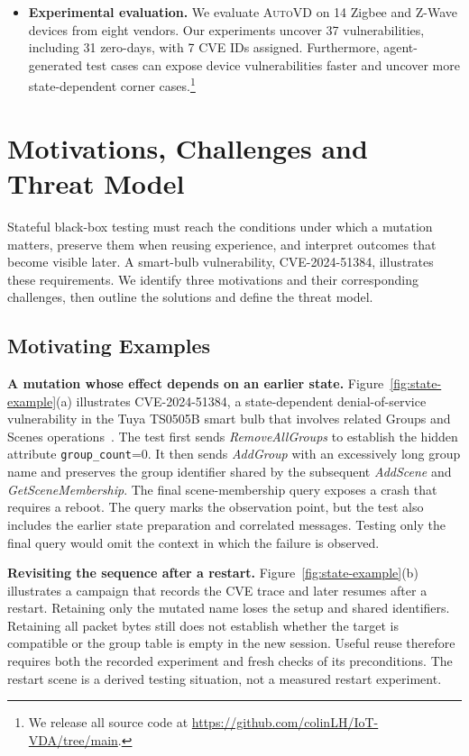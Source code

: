 \documentclass[10pt,journal,compsoc]{IEEEtran}
\newcommand{\system}{\textsc{AutoVD}}
\newcommand{\parab}[1]{\vspace{0.04in}\noindent\textbf{#1}}
\begin{document}
\begin{itemize}
  \item \textbf{Experimental evaluation.} We evaluate \system{} on 14 Zigbee and Z-Wave devices from eight vendors. Our experiments uncover 37 vulnerabilities, including 31 zero-days, with 7 CVE IDs assigned. Furthermore, agent-generated test cases can expose device vulnerabilities faster and uncover more state-dependent corner cases.\footnote{We release all source code at \url{https://github.com/colinLH/IoT-VDA/tree/main}.}
\end{itemize}

\section{Motivations, Challenges and Threat Model}\label{sec:motivation}
Stateful black-box testing must reach the conditions under which a mutation matters, preserve them when reusing experience, and interpret outcomes that become visible later. A smart-bulb vulnerability, CVE-2024-51384, illustrates these requirements. We identify three motivations and their corresponding challenges, then outline the solutions and define the threat model.

\subsection{Motivating Examples}\label{sec:examples}
\parab{A mutation whose effect depends on an earlier state.}
Figure~\ref{fig:state-example}(a) illustrates CVE-2024-51384, a state-dependent denial-of-service vulnerability in the Tuya TS0505B smart bulb that involves related Groups and Scenes operations~\cite{zvdetector}. The test first sends \emph{RemoveAllGroups} to establish the hidden attribute \texttt{group\_count}=0. It then sends \emph{AddGroup} with an excessively long group name and preserves the group identifier shared by the subsequent \emph{AddScene} and \emph{GetSceneMembership}. The final scene-membership query exposes a crash that requires a reboot. The query marks the observation point, but the test also includes the earlier state preparation and correlated messages. Testing only the final query would omit the context in which the failure is observed.

\parab{Revisiting the sequence after a restart.}
Figure~\ref{fig:state-example}(b) illustrates a campaign that records the CVE trace and later resumes after a restart. Retaining only the mutated name loses the setup and shared identifiers. Retaining all packet bytes still does not establish whether the target is compatible or the group table is empty in the new session. Useful reuse therefore requires both the recorded experiment and fresh checks of its preconditions. The restart scene is a derived testing situation, not a measured restart experiment.
\end{document}
